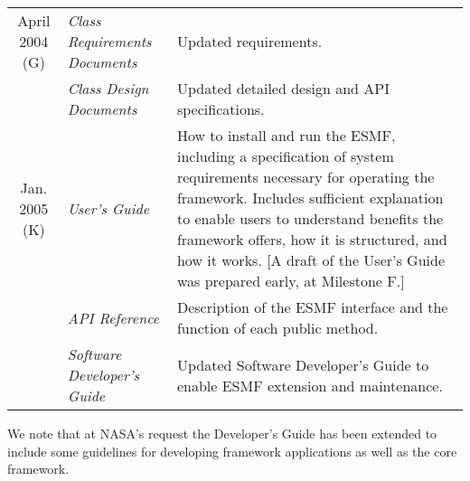 \begin{tabular}{c p{2in}p{3in}}
April 2004 (G) & {\it Class Requirements Documents} &
Updated requirements. \\
 
  & {\it Class Design Documents} &
Updated detailed design and API specifications. \\

Jan. 2005 (K) & {\it User's Guide} &
How to install and run the ESMF, including a specification of
system requirements necessary for operating the framework.  Includes 
sufficient explanation to enable users 
to understand benefits the framework offers, how it is structured, 
and how it works.  [A draft of the User's Guide was prepared early,
at Milestone F.]\\
  & {\it API Reference} &
Description of the ESMF interface and the function of each public 
method. \\ 
  & {\it Software Developer's Guide} &
Updated Software Developer's Guide to enable ESMF extension and
maintenance. \\  

\end{tabular}

We note that at NASA's request the Developer's Guide has been extended
to include some guidelines for developing framework applications as well as
the core framework.
























